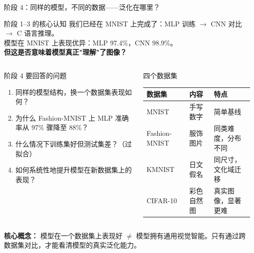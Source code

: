 \documentclass[aspectratio=169]{ctexbeamer}
\begin{document}
\begin{frame}[shrink=15]{阶段 4：同样的模型，不同的数据——泛化在哪里？}
\small

\begin{alertblock}{阶段 1--3 的核心认知}
\footnotesize
我们已经在 MNIST 上完成了：MLP 训练 $\to$ CNN 对比 $\to$ C 语言推理。\\
模型在 MNIST 上表现优异：MLP 97.4\%，CNN 98.9\%。\\
\textbf{但这是否意味着模型真正"理解"了图像？}
\end{alertblock}

\vspace{0.15cm}

\begin{columns}[T]
\begin{block}{阶段 4 要回答的问题}
\footnotesize
\begin{enumerate}
  \item 同样的模型结构，换一个数据集表现如何？
  \item 为什么 Fashion-MNIST 上 MLP 准确率从 97\% 骤降至 88\%？
  \item 什么情况下训练集好但测试集差？（过拟合）
  \item 如何系统性地提升模型在新数据集上的表现？
\end{enumerate}
\end{block}

\begin{block}{四个数据集}
\footnotesize
\centering
\begin{tabular}{l l l}
\toprule
\textbf{数据集} & \textbf{内容} & \textbf{特点} \\
\midrule
MNIST          & 手写数字   & 简单基线 \\
Fashion-MNIST  & 服饰图片   & 同类难度，分布不同 \\
KMNIST         & 日文假名   & 同尺寸，文化域迁移 \\
CIFAR-10       & 彩色自然图 & 真实图像，显著更难 \\
\bottomrule
\end{tabular}
\end{block}
\end{columns}

\vspace{0.15cm}
\footnotesize
\textbf{核心概念：} 模型在一个数据集上表现好 $\neq$ 模型拥有通用视觉智能。只有通过跨数据集对比，才能看清模型的真实泛化能力。
\end{frame}
\end{document}
